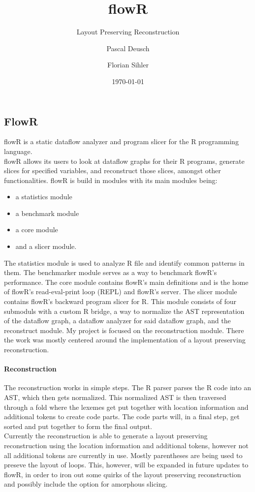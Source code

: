 \documentclass[a3paper, portrait, english, default]{uulm-cs-poster}
\title{flowR}
\subtitle{Layout Preserving Reconstruction}
\author{Pascal Deusch\and Florian Sihler}
\institute{Institut für Software Engineering und Programmiersprachen}
\date{\today}
\begin{document}
\maketitle
\begin{multicols}{2}
\section*{FlowR}
	flowR is a static dataflow analyzer and program slicer for the R programming language.\\%
	flowR allows its users to look at dataflow graphs for their R programs, generate slices for specified variables, and reconstruct those slices, amongst other functionalities.
	flowR is build in modules with its main modules being:
   \begin{itemize}
      \item a statistics module
      \item a benchmark module
	  \item a core module
      \item and a slicer module.
   \end{itemize}
	The statistics module is used to analyze R file and identify common patterns in them. The benchmarker module serves as a way to benchmark flowR's performance.
	The core module contains flowR's main definitions and is the home of flowR's read-eval-print loop (REPL) and flowR's server. The slicer module contains flowR's backward program slicer for R. This module consists of four submoduls with a custom R bridge, a way to normalize the AST representation of the dataflow graph, a dataflow analyzer for said dataflow graph, and the reconstruct module.
	My project is focused on the reconstruction module. There the work was mostly centered around the implementation of a layout preserving reconstruction.
	\paragraph{Reconstruction}
	The reconstruction works in simple steps. The R parser parses the R code into an AST, which then gets normalized. This normalized AST is then traversed through a fold where the lexemes get put together with location information and additional tokens to create code parts. The code parts will, in a final step, get sorted and put together to form the final output.\\
	Currently the reconstruction is able to generate a layout preserving reconstruction using the location information and additional tokens, however not all additional tokens are currently in use. Mostly parentheses are being used to preseve the layout of loops. This, however, will be expanded in future updates to flowR, in order to iron out some quirks of the layout preserving reconstruction and possibly include the option for amorphous slicing.

\end{multicols}
\end{document}
